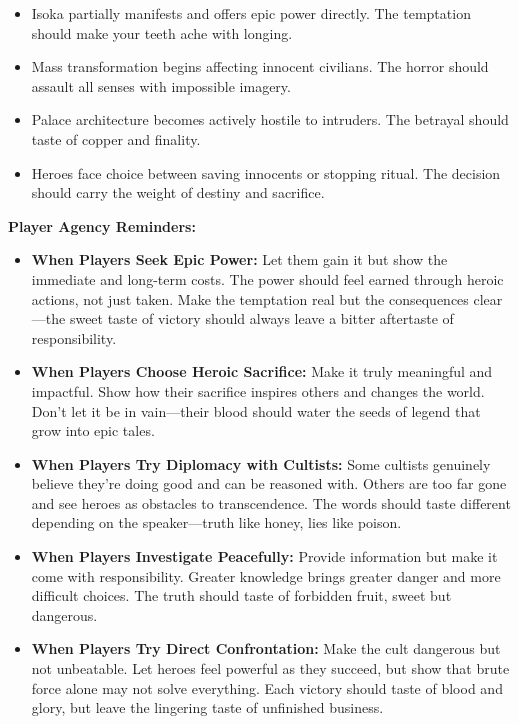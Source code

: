 \documentclass[11pt]{article}
\begin{document}
\begin{itemize}
  \begin{itemize}
  \item Isoka partially manifests and offers epic power directly. The temptation should make your teeth ache with longing.
  \item Mass transformation begins affecting innocent civilians. The horror should assault all senses with impossible imagery.
  \item Palace architecture becomes actively hostile to intruders. The betrayal should taste of copper and finality.
  \item Heroes face choice between saving innocents or stopping ritual. The decision should carry the weight of destiny and sacrifice.
  \end{itemize}
\end{itemize}

\textbf{Player Agency Reminders:}
\begin{itemize}
\item \textbf{When Players Seek Epic Power:} Let them gain it but show the immediate and long-term costs. The power should feel earned through heroic actions, not just taken. Make the temptation real but the consequences clear—the sweet taste of victory should always leave a bitter aftertaste of responsibility.
\item \textbf{When Players Choose Heroic Sacrifice:} Make it truly meaningful and impactful. Show how their sacrifice inspires others and changes the world. Don't let it be in vain—their blood should water the seeds of legend that grow into epic tales.
\item \textbf{When Players Try Diplomacy with Cultists:} Some cultists genuinely believe they're doing good and can be reasoned with. Others are too far gone and see heroes as obstacles to transcendence. The words should taste different depending on the speaker—truth like honey, lies like poison.
\item \textbf{When Players Investigate Peacefully:} Provide information but make it come with responsibility. Greater knowledge brings greater danger and more difficult choices. The truth should taste of forbidden fruit, sweet but dangerous.
\item \textbf{When Players Try Direct Confrontation:} Make the cult dangerous but not unbeatable. Let heroes feel powerful as they succeed, but show that brute force alone may not solve everything. Each victory should taste of blood and glory, but leave the lingering taste of unfinished business.
\end{itemize}
\end{document}
